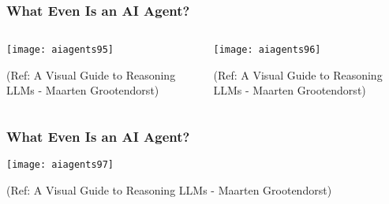 \begin{frame}[fragile]\frametitle{What Even Is an AI Agent?}


\begin{columns}
    \begin{column}[T]{0.6\linewidth}
        \begin{center}
        \texttt{[image: aiagents95]}

		
        {\tiny (Ref: A Visual Guide to Reasoning LLMs - Maarten Grootendorst)}
        \end{center}

    \end{column}
    \begin{column}[T]{0.4\linewidth}
        \begin{center}
        \texttt{[image: aiagents96]}

		
        {\tiny (Ref: A Visual Guide to Reasoning LLMs - Maarten Grootendorst)}
        \end{center}
    \end{column}
  \end{columns}
  
  


\end{frame}

\begin{frame}[fragile]\frametitle{What Even Is an AI Agent?}


        \begin{center}
        \texttt{[image: aiagents97]}

		
        {\tiny (Ref: A Visual Guide to Reasoning LLMs - Maarten Grootendorst)}
        \end{center}


\end{frame}


